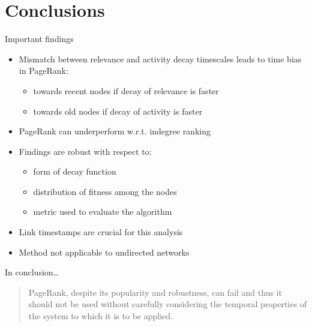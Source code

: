 \section{Conclusions}

\begin{frame}{Important findings}
    \begin{itemize}
        \item Mismatch between relevance and activity decay timescales leads to \alert{time bias} in PageRank:
        \begin{itemize}
            \item towards recent nodes if decay of relevance is faster
            \item towards old nodes if decay of activity is faster
        \end{itemize}
        \item PageRank can underperform w.r.t. \alert{indegree ranking}
        \item Findings are \alert{robust} with respect to:
        \begin{itemize}
            \item form of decay function
            \item distribution of fitness among the nodes
            \item metric used to evaluate the algorithm
        \end{itemize}
        \item Link \alert{timestamps} are crucial for this analysis
        \item Method not applicable to undirected networks
    \end{itemize}

\end{frame}

\begin{frame}{In conclusion\ldots}
    \begin{quote}
        PageRank, despite its popularity and robustness, \alert{can fail} and thus it should not be used without \alert{carefully considering the temporal properties of the system} to which it is to be applied.
    \end{quote}
\end{frame}
